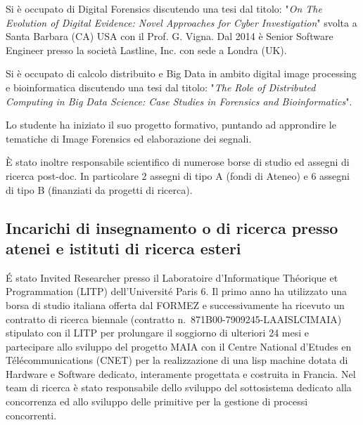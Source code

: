 \documentclass[11pt,a4paper,sans]{moderncv}        %
\begin{document}
{
Si è occupato di Digital Forensics discutendo una tesi dal titolo: "\emph{On The Evolution of Digital Evidence: Novel Approaches for Cyber Investigation}" svolta a Santa Barbara (CA) USA con il Prof. G. Vigna. Dal 2014 è Senior Software Engineer presso la società Lastline, Inc. con sede a Londra (UK). 
}

{
Si è occupato di calcolo distribuito e Big Data in ambito digital image processing e bioinformatica discutendo una tesi dal titolo: "\emph{The Role of Distributed Computing in Big Data Science: Case Studies in Forensics and Bioinformatics}".
}

{
Lo studente ha iniziato il suo progetto formativo, puntando ad approndire le tematiche di Image Forensics ed elaborazione dei segnali.
}

\medskip
\`E stato inoltre responsabile scientifico di numerose borse di studio ed assegni di ricerca post-doc. In particolare 2 assegni di tipo A (fondi di Ateneo) e 6 assegni di tipo B (finanziati da progetti di ricerca). 


\subsection{Incarichi di insegnamento o di ricerca presso atenei e istituti di ricerca esteri}

{
\'E stato Invited Researcher presso il Laboratoire d'Informatique Théorique et Programmation (LITP) dell'Université Paris 6. Il primo anno ha utilizzato una borsa di studio italiana offerta dal FORMEZ e successivamente ha ricevuto un contratto di ricerca biennale (contratto n.~871B00-7909245-LAAISLCIMAIA) stipulato con il LITP per prolungare il soggiorno di ulteriori 24 mesi e partecipare allo sviluppo del progetto MAIA con il Centre National d'Etudes en Télécommunications (CNET) per la realizzazione di una lisp machine dotata di Hardware e Software dedicato, interamente progettata e costruita in Francia. Nel team di ricerca è stato responsabile dello sviluppo del sottosistema dedicato alla concorrenza ed allo sviluppo delle primitive per la gestione di processi concorrenti.
}
\end{document}
